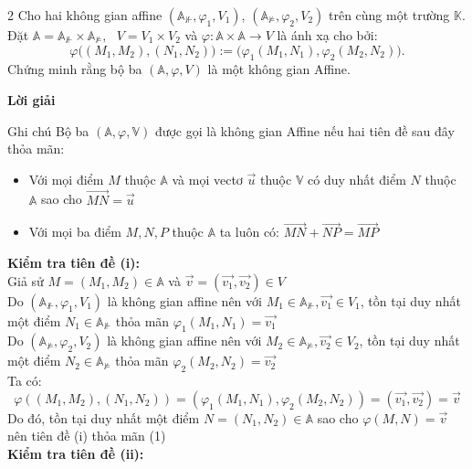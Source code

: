 \documentclass[12pt,a4paper]{article}
\newcommand{\Cau}[2]{
    \vspace{0.8cm} %
    \begin{BaiToanBox}{#1}
        #2
    \end{BaiToanBox}
}
\begin{document}
\Cau{2}{ Cho hai không gian affine $(\mathbb{A}_{\nVdash}, \varphi_1, V_1)$,
$(\mathbb{A}_{\nvDash}, \varphi_2, V_2)$ trên cùng một trường $\mathbb{K}$.
Đặt
\(
\mathbb{A} = \mathbb{A}_{\nVdash} \times \mathbb{A}_{\nvDash}, \text{ }
V = V_1 \times V_2
\)
và \( \varphi: \mathbb{A} \times \mathbb{A} \to V \) là ánh xạ cho bởi:
\[
\varphi\big((M_1, M_2), (N_1, N_2)\big)
:= \big(\varphi_1(M_1, N_1), \varphi_2(M_2, N_2)\big).
\]
Chứng minh rằng bộ ba $(\mathbb{A},\varphi,V)$ là một không gian Affine.
}
\begin{center}
{\large\bfseries\textcolor{mainpurple}{Lời giải}}
\end{center}
\begin{DinhNghiaBox}{Ghi chú}
Bộ ba \( (\mathbb{A}, \varphi, \mathbb{V}) \) được gọi là không gian Affine nếu hai tiên đề sau đây thỏa mãn:
\begin{itemize}
    \item Với mọi điểm \( M \) thuộc \( \mathbb{A}\) và mọi vectơ \( \vec{u} \) thuộc \( \mathbb{V} \) có duy nhất điểm \(N\) thuộc \( \mathbb{A} \) sao cho \( \overrightarrow{MN} = \vec{u} \)
    \item Với mọi ba điểm \(M,N,P\) thuộc \( \mathbb{A} \) ta luôn có: \( \overrightarrow{MN} + \overrightarrow{NP} = \overrightarrow{MP} \)
\end{itemize}
\end{DinhNghiaBox}
\textbf{Kiểm tra tiên đề (i):} \\[4pt]
Giả sử \( M=(M_1,M_2) \in \mathbb{A} \) và \( \vec{v}=(\vec{v_1},\vec{v_2}) \in V\) \\[4pt]
Do $(\mathbb{A}_{\nVdash}, \varphi_1, V_1) $ là không gian affine nên với \(M_1 \in \mathbb{A}_{\nVdash}, \vec{v_1} \in V_1 \), tồn tại duy nhất một điểm \( N_1 \in \mathbb{A}_{\nVdash} \) thỏa mãn \( \varphi_1(M_1,N_1)=\vec{v_1} \) \\[4pt]
Do $(\mathbb{A}_{\nvDash}, \varphi_2, V_2) $ là không gian affine nên với \(M_2 \in \mathbb{A}_{\nvDash}, \vec{v_2} \in V_2 \), tồn tại duy nhất một điểm \( N_2 \in \mathbb{A}_{\nvDash} \) thỏa mãn \( \varphi_2(M_2,N_2)=\vec{v_2} \) \\[4pt]
Ta có: \[
\varphi \left ( (M_1,M_2),(N_1,N_2) \right ) = \left ( \varphi_1 (M_1,N_1),\varphi_2 (M_2,N_2) \right ) = (\vec{v_1},\vec{v_2})=\vec{v}
\]
Do đó, tồn tại duy nhất một điểm \(N=(N_1,N_2) \in \mathbb{A}\) sao cho \( \varphi(M,N)=\vec{v} \) nên tiên đề (i) thỏa mãn \qquad (1) \\[4pt]
\textbf{Kiểm tra tiên đề (ii):} \\[4pt]
\end{document}
